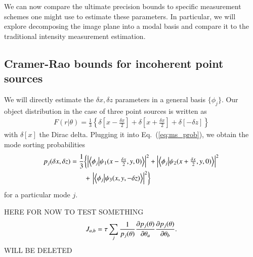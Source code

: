 \documentclass[reprint,amsmath,amssymb,aps,pra,floatfix]{revtex4-2}
\begin{document}
We can now compare the ultimate precision bounds to specific measurement schemes one might use to estimate these parameters. In particular, we will explore decomposing the image plane into a modal basis and compare it to the traditional intensity measurement estimation.


\subsection{\label{subsec:FI_ms_incoherent} Cramer-Rao bounds for incoherent point sources}
We will directly estimate the $\delta x, \delta z$ parameters in a general basis $\{ \phi_j \}$. Our object distribution in the case of three point sources is written as
\begin{align}
    F(r|\theta) = \frac{1}{3} \left \{ \delta \left [ x-\frac{\delta x}{2} \right ] + \delta \left [ x+\frac{\delta x}{2} \right ] + \delta \left [ -\delta z \right ] \right \}
\end{align}
with $\delta[x]$ the Dirac delta. Plugging it into Eq.~(\ref{eq:ms_prob}), we obtain the mode sorting probabilities
\begin{align}
    p_j(\delta x,\delta z) = \frac{1}{3} & \mbox{$\left \{ \abs{\braket{\phi_j}{\psi_1(x-\frac{\delta x}{2},y,0)} }^2 +
    \abs{\braket{\phi_j}{\psi_2(x+\frac{\delta x}{2},y,0)} }^2\right.$}   \nonumber \\
    & + \mbox{$ \left.  \abs{\braket{\phi_j}{\psi_3(x,y,-\delta z)} }^2 \right \}$}
\label{eq:prob_ms_3src}
\end{align}
for a particular mode $j$.

HERE FOR NOW TO TEST SOMETHING
\begin{align}
    J_{a,b} = \tau \sum_j\frac{1}{p_j(\theta)} \pdv{p_j(\theta)}{\theta_a}  \pdv{p_j(\theta)}{\theta_b}.
\label{eq:FI_MS}
\end{align}
WILL BE DELETED
\end{document}
